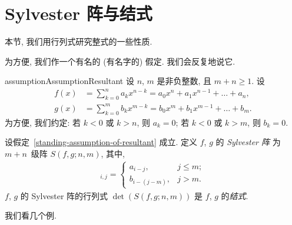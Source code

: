 \documentclass[../libro.tex]{subfiles}
\begin{document}

\section{Sylvester 阵与结式}

本节, 我们用行列式研究整式的一些性质.

为方便, 我们作一个有名的 (有名字的) 假定.
我们会反复地说它.

\begin{restatable}{assumption}{AssumptionResultant}%
    \label{standing-assumption-of-resultant}
    设 \(n\), \(m\) 是非负整数,
    且 \(m + n \geq 1\).
    设
    \begin{align*}
        f(x) &
        = \sum_{k = 0}^{n} {a_k x^{n-k}}
        = a_0 x^n + a_1 x^{n-1} + \dots + a_n,
        \\
        g(x) &
        = \sum_{k = 0}^{m} {b_k x^{m-k}}
        = b_0 x^m + b_1 x^{m-1} + \dots + b_m.
    \end{align*}
    为方便, 我们约定:
    若 \(k < 0\) 或 \(k > n\), 则 \(a_k = 0\);
    若 \(k < 0\) 或 \(k > m\), 则 \(b_k = 0\).
\end{restatable}

\begin{definition}
    设假定~\ref{standing-assumption-of-resultant} 成立.
    定义 \(f\), \(g\) 的 \emph{Sylvester 阵}%
    为 \(m + n\)~级阵
    \(S(f, g; n, m)\),
    其中,
    \begin{align*}
        [S(f, g; n, m)]_{i,j} =
        \begin{cases}
            a_{i-j},     & j \leq m; \\
            b_{i-(j-m)}, & j > m.
        \end{cases}
    \end{align*}
    \(f\), \(g\) 的 Sylvester 阵的行列式
    \(\det {(S(f, g; n, m))}\)
    是 \(f\), \(g\) 的\emph{结式}.
\end{definition}

我们看几个例.
\end{document}
